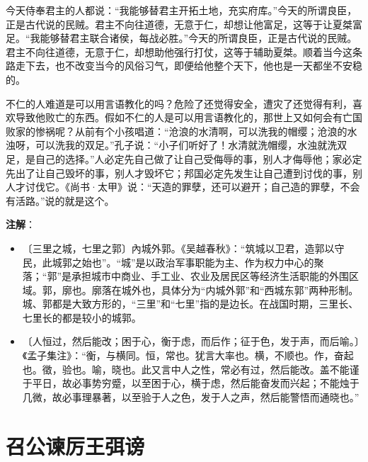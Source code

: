 \documentclass[12pt,UTF-8,openany]{ctexbook}
\begin{document}
\begin{normalsize}
    今天侍奉君主的人都说：“我能够替君主开拓土地，充实府库。”今天的所谓良臣，正是古代说的民贼。君主不向往道德，无意于仁，却想让他富足，这等于让夏桀富足。“我能够替君主联合诸侯，每战必胜。”今天的所谓良臣，正是古代说的民贼。君主不向往道德，无意于仁，却想助他强行打仗，这等于辅助夏桀。顺着当今这条路走下去，也不改变当今的风俗习气，即便给他整个天下，他也是一天都坐不安稳的。
    
    不仁的人难道是可以用言语教化的吗？危险了还觉得安全，遭灾了还觉得有利，喜欢导致他败亡的东西。假如不仁的人是可以用言语教化的，那世上又如何会有亡国败家的惨祸呢？从前有个小孩唱道：“沧浪的水清啊，可以洗我的帽缨；沧浪的水浊呀，可以洗我的双足。”孔子说：“小子们听好了！水清就洗帽缨，水浊就洗双足，是自己的选择。”人必定先自己做了让自己受侮辱的事，别人才侮辱他；家必定先出了让自己毁坏的事，别人才毁坏它；邦国必定先发生让自己遭到讨伐的事，别人才讨伐它。《尚书·太甲》说：“天造的罪孽，还可以避开；自己造的罪孽，不会有活路。”说的就是这个。
    
\end{normalsize}


\newpage

\textbf{注解}：

\vspace{-1em}

\begin{itemize}
    \setlength\itemsep{-0.2em}
    \item〔三里之城，七里之郭〕內城外郭。《吴越春秋》：“筑城以卫君，造郭以守民，此城郭之始也”。“城”是以政治军事职能为主、作为权力中心的聚落；“郭”是承担城市中商业、手工业、农业及居民区等经济生活职能的外围区域。郭，廓也。廓落在城外也，具体分为“内城外郭”和“西城东郭”两种形制。城、郭都是大致方形的，“三里”和“七里”指的是边长。在战国时期，三里长、七里长的都是较小的城郭。
    \item〔人恒过，然后能改；困于心，衡于虑，而后作；征于色，发于声，而后喻。〕《孟子集注》：“衡，与横同。恒，常也。犹言大率也。横，不顺也。作，奋起也。徵，验也。喻，晓也。此又言中人之性，常必有过，然后能改。盖不能谨于平日，故必事势穷蹙，以至困于心，横于虑，然后能奋发而兴起；不能烛于几微，故必事理暴著，以至验于人之色，发于人之声，然后能警悟而通晓也。”
\end{itemize}

\chapter{召公谏厉王弭谤}
\end{document}
